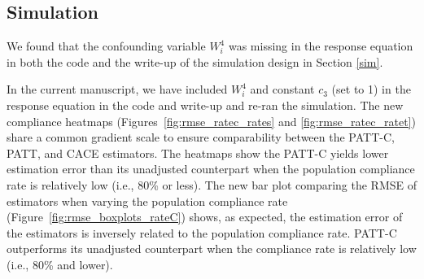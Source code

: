 \documentclass[hidelinks,12pt,letterpaper]{article}
\begin{document}
\subsection{Simulation}
We found that the confounding variable $W^{4}_i$ was missing in the response equation in both the code and the write-up of the simulation design in Section \ref{sim}. 

In the current manuscript, we have included $W^{4}_i$ and constant $c_3$ (set to 1) in the response equation in the code and write-up and re-ran the simulation. The new compliance heatmaps (Figures~\ref{fig:rmse_ratec_rates} and \ref{fig:rmse_ratec_ratet}) share a common gradient scale to ensure comparability between the PATT-C, PATT, and CACE estimators. The heatmaps show the PATT-C yields lower estimation error than its unadjusted counterpart when the population compliance rate is relatively low (i.e., 80\% or less). The new bar plot comparing the RMSE of estimators when varying the population compliance rate (Figure~\ref{fig:rmse_boxplots_rateC}) shows, as expected, the estimation error of the estimators is inversely related to the population compliance rate. PATT-C outperforms its unadjusted counterpart when the compliance rate is relatively low (i.e., 80\% and lower). 



\printbibliography
\end{document}
